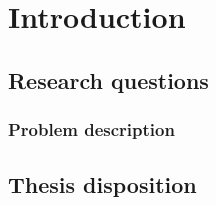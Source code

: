 \chapter{Introduction}%
\label{sec:introduction}



\clearpage
\section{Research questions}


\subsection{Problem description}%
\label{sec:segmentation-description}


\clearpage
\section{Thesis disposition}

